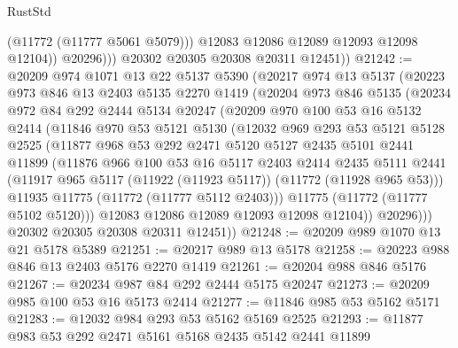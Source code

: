 \begin{lexlean}{RustStd}
\begin{coremodule}
                    (@11772 (@11777 @5061 @5079)))
                  @12083
                  @12086
                  @12089
                  @12093
                  @12098
                  @12104))
              @20296)))
        @20302
        @20305
        @20308
        @20311
        @12451))
@21242 := @20209
    @974
    @1071
    @13
    @22
    @5137
    @5390
    (@20217
      @974
      @13
      @5137
      (@20223
        @973
        @846
        @13
        @2403
        @5135
        @2270
        @1419
        (@20204
          @973
          @846
          @5135
          (@20234
            @972
            @84
            @292
            @2444
            @5134
            @20247
            (@20209
              @970
              @100
              @53
              @16
              @5132
              @2414
              (@11846
                @970
                @53
                @5121
                @5130
                (@12032
                  @969
                  @293
                  @53
                  @5121
                  @5128
                  @2525
                  (@11877
                    @968
                    @53
                    @292
                    @2471
                    @5120
                    @5127
                    @2435
                    @5101
                    @2441
                    @11899
                    (@11876
                      @966
                      @100
                      @53
                      @16
                      @5117
                      @2403
                      @2414
                      @2435
                      @5111
                      @2441
                      (@11917 @965 @5117 (@11922 (@11923 @5117)) (@11772 (@11928 @965 @53)))
                      @11935
                      @11775
                      (@11772 (@11777 @5112 @2403)))
                    @11775
                    (@11772 (@11777 @5102 @5120)))
                  @12083
                  @12086
                  @12089
                  @12093
                  @12098
                  @12104))
              @20296)))
        @20302
        @20305
        @20308
        @20311
        @12451))
@21248 := @20209 @989 @1070 @13 @21 @5178 @5389
@21251 := @20217 @989 @13 @5178
@21258 := @20223 @988 @846 @13 @2403 @5176 @2270 @1419
@21261 := @20204 @988 @846 @5176
@21267 := @20234 @987 @84 @292 @2444 @5175 @20247
@21273 := @20209 @985 @100 @53 @16 @5173 @2414
@21277 := @11846 @985 @53 @5162 @5171
@21283 := @12032 @984 @293 @53 @5162 @5169 @2525
@21293 := @11877 @983 @53 @292 @2471 @5161 @5168 @2435 @5142 @2441 @11899

\end{coremodule}
\end{lexlean}
